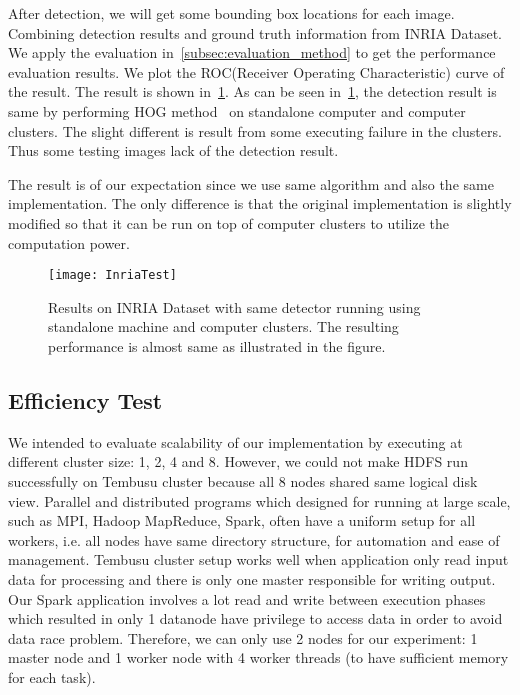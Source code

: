 After detection, we will get some bounding box locations for each image.
Combining detection results and ground truth information from INRIA Dataset.
We apply the evaluation in~\ref{subsec:evaluation_method} to get the
performance evaluation results. We plot the ROC(Receiver Operating
Characteristic) curve of the result.
The result is shown in~\fig\ref{fig:inria_roc}. As can be seen
in~\fig\ref{fig:inria_roc}, the detection result is same by performing HOG
method~\cite{2005_CVPR_Dalal} on standalone computer and computer clusters. The
slight different is result from some executing failure in the clusters. Thus
some testing images lack of the detection result. 

The result is of our expectation since we use same algorithm and also the same
implementation. The only difference is that the original implementation is
slightly modified so that it can be run on top of computer clusters to utilize
the computation power. 


\begin{figure}[!t]
  \centering
  \begin{minipage}{1.0\columnwidth}
  \texttt{[image: InriaTest]}
  \end{minipage}
  
  \vspace{-1ex}
  \caption
    {
    \small
	Results on INRIA Dataset with same detector running using standalone machine
	and computer clusters. The resulting performance is almost same as illustrated
	in the figure. }
  \label{fig:inria_roc}
\end{figure}

\subsection{Efficiency Test}
We intended to evaluate scalability of our implementation by executing at
different cluster size: 1, 2, 4 and 8. However, we could not make HDFS run
successfully on Tembusu cluster because all 8 nodes shared same logical disk
view. Parallel and distributed programs which designed for running at large
scale, such as MPI, Hadoop MapReduce, Spark, often have a uniform setup for all
workers, i.e. all nodes have same directory structure, for automation and
ease of management. Tembusu cluster setup works well when application only read
input data for processing and there is only one master responsible for writing
output. Our Spark application involves a lot read and write between
execution phases which resulted in only 1 datanode have privilege to access data
in order to avoid data race problem. Therefore, we can only use 2 nodes for our
experiment: 1 master node and 1 worker node with 4 worker threads (to have
sufficient memory for each task).

